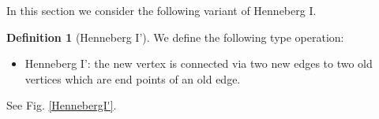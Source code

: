 \documentclass[11pt]{amsart}
\theoremstyle{definition}
\newtheorem{defn}[thm]{Definition}
\theoremstyle{remark}
\numberwithin{equation}{section}
\begin{document}
In this section we consider the following variant of Henneberg I.
\begin{defn}[Henneberg I']
We define the following type operation:
\begin{itemize}
  \item Henneberg I': the new vertex is connected via two new edges to two old vertices which are end points of an old edge.
\end{itemize}
See Fig. \ref{HennebergI'}.
\end{defn}
\begin{figure}[htp]
  \centering



\begin{tikzpicture}[x=0.75pt,y=0.75pt,yscale=-1,xscale=1]


\end{tikzpicture}
\end{figure}
\end{document}
